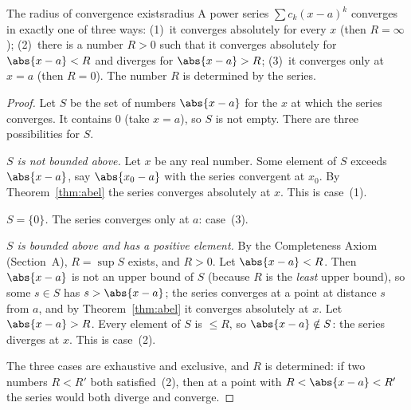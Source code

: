 \documentclass[11pt]{article}
\begin{document}
\begin{thm}{The radius of convergence exists}{radius}
A power series $\sum c_k(x-a)^k$ converges in exactly one of three ways: (1)~it converges absolutely for every $x$ (then $R=\infty$); (2)~there is a number $R>0$ such that it converges absolutely for $\abs{x-a}<R$ and diverges for $\abs{x-a}>R$; (3)~it converges only at $x=a$ (then $R=0$). The number $R$ is determined by the series.
\end{thm}
\begin{proof}
Let $S$ be the set of numbers $\abs{x-a}$ for the $x$ at which the series converges. It contains $0$ (take $x=a$), so $S$ is not empty. There are three possibilities for $S$.

\emph{$S$ is not bounded above.} Let $x$ be any real number. Some element of $S$ exceeds $\abs{x-a}$, say $\abs{x_0-a}$ with the series convergent at $x_0$. By Theorem~\ref{thm:abel} the series converges absolutely at $x$. This is case~(1).

\emph{$S=\{0\}$.} The series converges only at $a$: case~(3).

\emph{$S$ is bounded above and has a positive element.} By the Completeness Axiom (Section~A), $R=\sup S$ exists, and $R>0$. Let $\abs{x-a}<R$. Then $\abs{x-a}$ is not an upper bound of $S$ (because $R$ is the \emph{least} upper bound), so some $s\in S$ has $s>\abs{x-a}$; the series converges at a point at distance $s$ from $a$, and by Theorem~\ref{thm:abel} it converges absolutely at $x$. Let $\abs{x-a}>R$. Every element of $S$ is $\le R$, so $\abs{x-a}\notin S$: the series diverges at $x$. This is case~(2).

The three cases are exhaustive and exclusive, and $R$ is determined: if two numbers $R<R'$ both satisfied~(2), then at a point with $R<\abs{x-a}<R'$ the series would both diverge and converge.
\end{proof}
\end{document}
